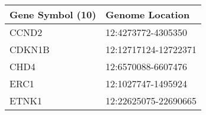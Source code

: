 \begin{tabular}{ll}
\toprule
Gene Symbol (10) &      Genome Location \\
\midrule
           CCND2 &   12:4273772-4305350 \\
          CDKN1B & 12:12717124-12722371 \\
            CHD4 &   12:6570088-6607476 \\
            ERC1 &   12:1027747-1495924 \\
           ETNK1 & 12:22625075-22690665 \\
\bottomrule
\end{tabular}
